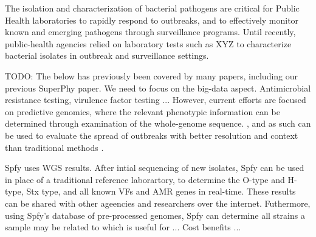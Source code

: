\documentclass[a4,center,fleqn]{NAR}
\begin{document}
The isolation and characterization of bacterial pathogens are critical for Public Health laboratories to rapidly respond to outbreaks, and to effectively monitor known and emerging pathogens through surveillance programs.
Until recently, public-health agencies relied on laboratory tests such as XYZ to characterize bacterial isolates in outbreak and surveillance settings.

TODO: The below has previously been covered by many papers, including our previous SuperPhy paper. We need to focus on the big-data aspect.
Antimicrobial resistance testing, virulence factor testing ...
However, current efforts are focused on predictive genomics, where the relevant phenotypic information can be determined through examination of the whole-genome sequence.
, and as such can be used to evaluate the spread of outbreaks with better resolution and context than traditional methods \cite{ronholm2016navigating}.

Spfy uses WGS results.
After intial sequencing of new isolates, Spfy can be used in place of a traditional reference laborartory, to determine the O-type and H-type, Stx type, and all known VFs and AMR genes in real-time.
These results can be shared with other ageencies and researchers over the internet.
Futhermore, using Spfy's database of pre-processed genomes, Spfy can determine all strains a sample may be related to which is useful for ...
Cost benefits ...
\end{document}
